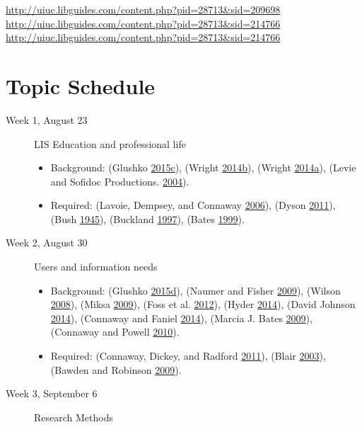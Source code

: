 \documentclass[]{article}
\providecommand{\tightlist}{%
  \setlength{\itemsep}{0pt}\setlength{\parskip}{0pt}}
\begin{document}
\url{http://uiuc.libguides.com/content.php?pid=28713\&sid=209698}
\url{http://uiuc.libguides.com/content.php?pid=28713\&sid=214766}
\url{http://uiuc.libguides.com/content.php?pid=28713\&sid=214766}

\section{Topic Schedule}\label{topic-schedule}

\begin{description}
\item[Week 1, August 23]
LIS Education and professional life

\begin{itemize}
\tightlist
\item
  Background: (Glushko
  \protect\hyperlink{ref-glushkoux5ffoundationux5f2015}{2015}\protect\hyperlink{ref-glushkoux5ffoundationux5f2015}{c}),
  (Wright
  \protect\hyperlink{ref-wrightux5fsecretux5f2014}{2014}\protect\hyperlink{ref-wrightux5fsecretux5f2014}{b}),
  (Wright
  \protect\hyperlink{ref-wrightux5fcatalogingux5f2014}{2014}\protect\hyperlink{ref-wrightux5fcatalogingux5f2014}{a}),
  (Levie and Sofidoc Productions.
  \protect\hyperlink{ref-levieux5fmanux5f2004}{2004}).
\item
  Required: (Lavoie, Dempsey, and Connaway
  \protect\hyperlink{ref-lavoieux5fmakingux5f2006}{2006}), (Dyson
  \protect\hyperlink{ref-dysonux5fhowux5f2011}{2011}), (Bush
  \protect\hyperlink{ref-bushux5fasux5f1945}{1945}), (Buckland
  \protect\hyperlink{ref-bucklandux5fwhatux5f1997}{1997}), (Bates
  \protect\hyperlink{ref-batesux5finvisibleux5f1999}{1999}).
\end{itemize}
\item[Week 2, August 30]
Users and information needs

\begin{itemize}
\tightlist
\item
  Background: (Glushko
  \protect\hyperlink{ref-glushkoux5finteractionsux5f2015}{2015}\protect\hyperlink{ref-glushkoux5finteractionsux5f2015}{d}),
  (Naumer and Fisher
  \protect\hyperlink{ref-naumerux5finformationux5f2009}{2009}), (Wilson
  \protect\hyperlink{ref-wilsonux5finformationux5f2008}{2008}), (Miksa
  \protect\hyperlink{ref-miksaux5finformationux5f2009}{2009}), (Foss et
  al. \protect\hyperlink{ref-fossux5fchildrensux5f2012}{2012}), (Hyder
  \protect\hyperlink{ref-hyderux5freadingux5f2014}{2014}), (David
  Johnson
  \protect\hyperlink{ref-davidux5fjohnsonux5fhealth-relatedux5f2014}{2014}),
  (Connaway and Faniel
  \protect\hyperlink{ref-connawayux5freorderingux5f2014}{2014}), (Marcia
  J. Bates
  \protect\hyperlink{ref-marciaux5fj.ux5fbatesux5finformationux5f2009}{2009}),
  (Connaway and Powell
  \protect\hyperlink{ref-connawayux5fselectingux5f2010}{2010}).
\item
  Required: (Connaway, Dickey, and Radford
  \protect\hyperlink{ref-connawayux5fifux5f2011}{2011}), (Blair
  \protect\hyperlink{ref-blairux5freadingux5f2003}{2003}), (Bawden and
  Robinson \protect\hyperlink{ref-bawdenux5fdarkux5f2009}{2009}).
\end{itemize}
\item[Week 3, September 6]
Research Methods


\end{description}
\end{document}
